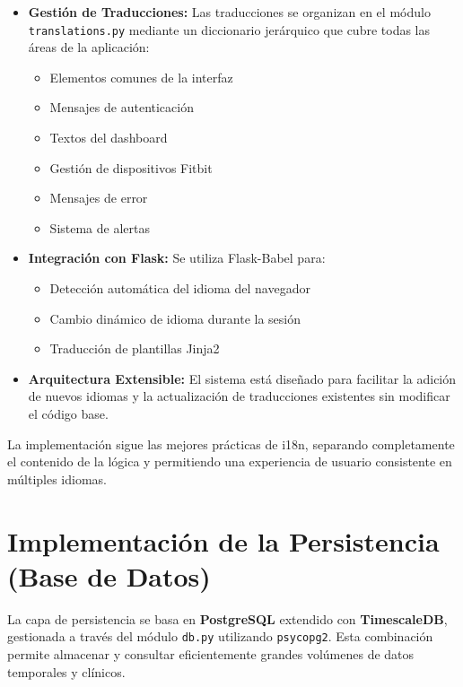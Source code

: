 \begin{itemize}
    \item \textbf{Gestión de Traducciones:} Las traducciones se organizan en el módulo \texttt{translations.py} mediante un diccionario jerárquico que cubre todas las áreas de la aplicación:
        \begin{itemize}
            \item Elementos comunes de la interfaz
            \item Mensajes de autenticación
            \item Textos del dashboard
            \item Gestión de dispositivos Fitbit
            \item Mensajes de error
            \item Sistema de alertas
        \end{itemize}
    \item \textbf{Integración con Flask:} Se utiliza Flask-Babel para:
        \begin{itemize}
            \item Detección automática del idioma del navegador
            \item Cambio dinámico de idioma durante la sesión
            \item Traducción de plantillas Jinja2
        \end{itemize}
    \item \textbf{Arquitectura Extensible:} El sistema está diseñado para facilitar la adición de nuevos idiomas y la actualización de traducciones existentes sin modificar el código base.
\end{itemize}

La implementación sigue las mejores prácticas de i18n, separando completamente el contenido de la lógica y permitiendo una experiencia de usuario consistente en múltiples idiomas.

\section{Implementación de la Persistencia (Base de Datos)}
\label{sec:impl_persistencia}

La capa de persistencia se basa en \textbf{PostgreSQL} extendido con \textbf{TimescaleDB}, gestionada a través del módulo \texttt{db.py} utilizando \texttt{psycopg2}. Esta combinación permite almacenar y consultar eficientemente grandes volúmenes de datos temporales y clínicos.

